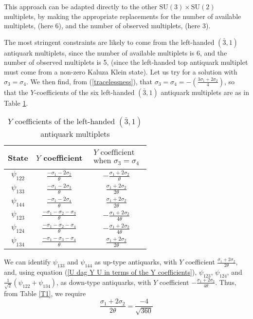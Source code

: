 \documentclass[a4paper,12pt,oneside]{article}
\begin{document}
This approach can be adapted directly to the other $\mathrm{SU}(3)
\times\mathrm{SU}(2)$ multiplets, by making the appropriate 
replacements for the number of available multiplets, (here 6), and
the number of observed multiplets, (here 3).

The most stringent constraints are likely to come from the
left-handed $(\bar{3},1)$ antiquark multiplets, since the number of
available multiplets is 6, and the number of observed multiplets is
5, (since the left-handed top antiquark multiplet must come from a
non-zero Kaluza Klein state).  Let us try for a solution with
$\sigma_3 = \sigma_4$.  We then find, from (\ref{tracelessness}), 
that $\sigma_3 = \sigma_4 = -\left(\frac{3\sigma_1+2\sigma_2}{4}
\right)$, so that the $Y$-coefficients of the six left-handed
$(\bar{3},1)$ antiquark multiplets are as in Table \ref{T4}.

\begin{table}
\begin{center}
\begin{tabular}{|c|c|c|}\hline
State & $Y$ coefficient &
$\begin{array}{c}Y\textrm{ coefficient} \\
\textrm{when }\sigma_3=\sigma_4 \end{array}$ \\ 
\hline
$\psi_{122}$ & $\frac{-\sigma_1-2\sigma_2}{\theta}$ &
$-\frac{\sigma_1+2\sigma_2}{\theta}$ \\ 
$\psi_{133}$ & $\frac{-\sigma_1-2\sigma_3}{\theta}$ &
$\frac{\sigma_1+2\sigma_2}{2\theta}$ \\ 
$\psi_{144}$ & $\frac{-\sigma_1-2\sigma_4}{\theta}$ &
$\frac{\sigma_1+2\sigma_2}{2\theta}$ \\ 
$\psi_{123}$ & $\frac{-\sigma_1-\sigma_2-\sigma_3}{\theta}$ &
$-\frac{\sigma_1+2\sigma_2}{4\theta}$ \\ 
$\psi_{124}$ & $\frac{-\sigma_1-\sigma_2-\sigma_4}{\theta}$ &
$-\frac{\sigma_1+2\sigma_2}{4\theta}$ \\ 
$\psi_{134}$ & $\frac{-\sigma_1-\sigma_3-\sigma_4}{\theta}$ &
$\frac{\sigma_1+2\sigma_2}{2\theta}$ \\ \hline
\end{tabular}
\caption{\label{T4}
$Y$ coefficients of the left-handed $(\bar{3},1)$ antiquark 
multiplets}
\end{center}
\end{table}

We can identify $\psi_{133}$ and $\psi_{144}$ as up-type antiquarks,
with $Y$ coefficient $\frac{\sigma_1+2\sigma_2}{2\theta}$, and,
using equation (\ref{U dag Y U in terms of the Y coefficients}),
$\psi_{123}$, $\psi_{124}$, and $\frac{1}{\sqrt{2}}\left(\psi_{122}+
\psi_{134}\right)$, as down-type antiquarks, with $Y$ coefficient
$-\frac{\sigma_1+2\sigma_2}{4\theta}$.  Thus, from Table \ref{T1},
we require
\begin{equation}\label{condition on the sigmas for the antiquarks}
\frac{\sigma_1+2\sigma_2}{2\theta}=\frac{-4}{\sqrt{360}}
\end{equation}
\end{document}
